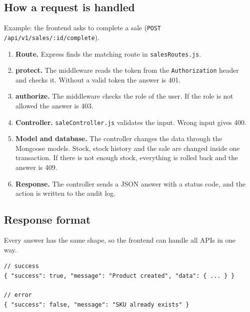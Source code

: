 \documentclass[11pt,a4paper]{article}
\newcommand{\code}[1]{\texttt{#1}}
\begin{document}
\subsection{How a request is handled}
Example: the frontend asks to complete a sale (\code{POST /api/v1/sales/:id/complete}).
\begin{enumerate}
  \item \textbf{Route.} Express finds the matching route in \code{salesRoutes.js}.
  \item \textbf{protect.} The middleware reads the token from the \code{Authorization} header and checks it. Without a valid token the answer is 401.
  \item \textbf{authorize.} The middleware checks the role of the user. If the role is not allowed the answer is 403.
  \item \textbf{Controller.} \code{saleController.js} validates the input. Wrong input gives 400.
  \item \textbf{Model and database.} The controller changes the data through the Mongoose models. Stock, stock history and the sale are changed inside one transaction. If there is not enough stock, everything is rolled back and the answer is 409.
  \item \textbf{Response.} The controller sends a JSON answer with a status code, and the action is written to the audit log.
\end{enumerate}

\subsection{Response format}
Every answer has the same shape, so the frontend can handle all APIs in one way.
\begin{lstlisting}[style=query]
// success
{ "success": true, "message": "Product created", "data": { ... } }

// error
{ "success": false, "message": "SKU already exists" }
\end{lstlisting}
\end{document}
